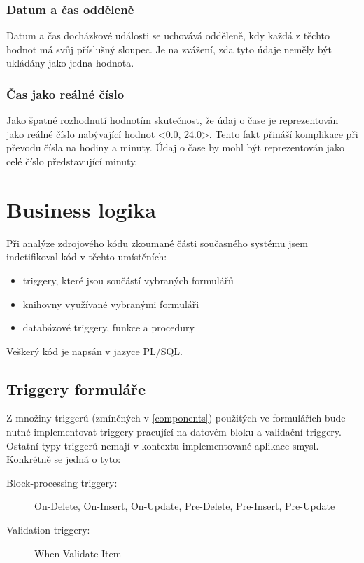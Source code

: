 \documentclass{diplomka}
\begin{document}
\subsubsection*{Datum a čas odděleně}
Datum a čas docházkové události se uchovává odděleně, kdy každá z těchto hodnot má svůj příslušný sloupec. Je na zvážení, zda tyto údaje neměly být ukládány jako jedna hodnota.

\subsubsection*{Čas jako reálné číslo}
Jako špatné rozhodnutí hodnotím skutečnost, že údaj o čase je reprezentován jako reálné číslo nabývající hodnot <0.0, 24.0>.  Tento fakt přináší komplikace při převodu čísla na hodiny a minuty. Údaj o čase by mohl být reprezentován jako celé číslo představující minuty.

\section{Business logika}
Při analýze zdrojového kódu zkoumané části současného systému jsem indetifikoval kód v těchto umístěních:
\vspace{-2mm}
\begin{itemize}%
\item triggery, které jsou součástí vybraných formulářů
\item knihovny využívané vybranými formuláři
\item databázové triggery, funkce a procedury
\end{itemize}
Veškerý kód je napsán v jazyce PL/SQL.
\subsection{Triggery formuláře}
Z množiny triggerů (zmíněných v \ref{components}) použitých ve formulářích bude nutné implementovat triggery pracující na datovém bloku a validační triggery. Ostatní typy triggerů nemají v kontextu implementované aplikace smysl. Konkrétně se jedná o tyto:

\begin{description}
\item [Block-processing triggery:] On-Delete, On-Insert, On-Update, Pre-Delete, Pre-Insert, Pre-Update
\item [Validation triggery:] When-Validate-Item
\end{description}
\end{document}
